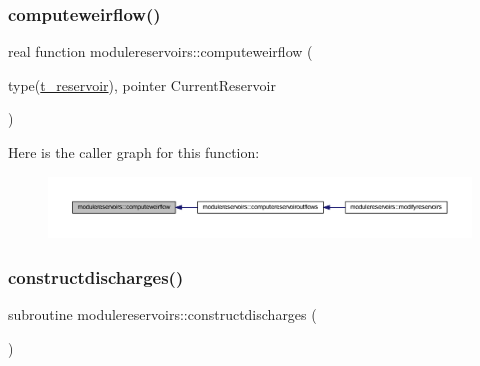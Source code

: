 \subsubsection{\texorpdfstring{computeweirflow()}{computeweirflow()}}
{\footnotesize\ttfamily real function modulereservoirs\+::computeweirflow (\begin{DoxyParamCaption}\item[{type(\mbox{\hyperlink{structmodulereservoirs_1_1t__reservoir}{t\+\_\+reservoir}}), pointer}]{Current\+Reservoir }\end{DoxyParamCaption})\hspace{0.3cm}{\ttfamily [private]}}

Here is the caller graph for this function\+:\nopagebreak
\begin{figure}[H]
\begin{center}
\leavevmode
\includegraphics[width=350pt]{namespacemodulereservoirs_afd25bc9bcd078252383e6f67ef148826_icgraph}
\end{center}
\end{figure}
\mbox{\label{namespacemodulereservoirs_a720deae8cfb3dc32643ce6afdfa4d187}} 
\subsubsection{\texorpdfstring{constructdischarges()}{constructdischarges()}}
{\footnotesize\ttfamily subroutine modulereservoirs\+::constructdischarges (\begin{DoxyParamCaption}{ }\end{DoxyParamCaption})\hspace{0.3cm}{\ttfamily [private]}}


